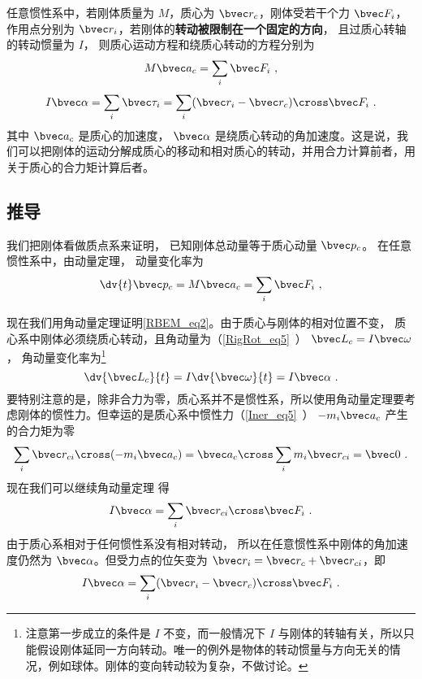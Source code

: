 

任意惯性系中，若刚体质量为 $M$，质心为 $\bvec r_c$，刚体受若干个力 $\bvec F_i$，作用点分别为 $\bvec r_i$，若刚体的\textbf{转动被限制在一个固定的方向}， 且过质心转轴的转动惯量为 $I$， 则质心运动方程和绕质心转动的方程分别为
\begin{equation}\label{RBEM_eq1}
M\bvec a_c = \sum_i \bvec F_i~,
\end{equation}
\begin{equation}\label{RBEM_eq2}
I \bvec \alpha = \sum_i \bvec \tau_i = \sum_i (\bvec r_i-\bvec r_c) \cross  \bvec F_i~.
\end{equation}
其中 $\bvec a_c$ 是质心的加速度， $\bvec \alpha$ 是绕质心转动的角加速度。这是说，我们可以把刚体的运动分解成质心的移动和相对质心的转动，并用合力计算前者，用关于质心的合力矩计算后者。

\subsection{推导}
我们把刚体看做质点系来证明， 已知刚体总动量等于质心动量 $\bvec p_c$。 在任意惯性系中，由动量定理， 动量变化率为
\begin{equation}
\dv{t} \bvec p_c = M \bvec a_c = \sum_i \bvec F_i~,
\end{equation}

现在我们用角动量定理证明\autoref{RBEM_eq2}。由于质心与刚体的相对位置不变，%
质心系中刚体必须绕质心转动，且角动量为（\autoref{RigRot_eq5}~） $\bvec L_c = I \bvec\omega$， 角动量变化率为\footnote{注意第一步成立的条件是 $I$ 不变，而一般情况下 $I$ 与刚体的转轴有关，所以只能假设刚体延同一方向转动。唯一的例外是物体的转动惯量与方向无关的情况，例如球体。刚体的变向转动较为复杂，不做讨论。}
\begin{equation}
\dv{\bvec L_c}{t} = I \dv{\bvec \omega}{t} = I \bvec\alpha~.
\end{equation}
要特别注意的是，除非合力为零，质心系并不是惯性系，所以使用角动量定理要考虑刚体的惯性力。但幸运的是质心系中惯性力（\autoref{Iner_eq5}~） $-m_i \bvec a_c$ 产生的合力矩为零
\begin{equation}
\sum_i \bvec r_{ci}\cross (-m_i \bvec a_{c}) = \bvec a_{c} \cross \sum_i m_i \bvec r_{ci} = \bvec 0~.
\end{equation}
现在我们可以继续角动量定理 得
\begin{equation}
I \bvec\alpha = \sum_i \bvec r_{ci} \cross  \bvec F_i~.
\end{equation}
由于质心系相对于任何惯性系没有相对转动， 所以在任意惯性系中刚体的角加速度仍然为 $\bvec\alpha$。但受力点的位矢变为 $\bvec r_i = \bvec r_c + \bvec r_{ci}$，即
\begin{equation}\label{RBEM_eq7}
I \bvec \alpha = \sum_i (\bvec r_i-\bvec r_c) \cross  \bvec F_i~.
\end{equation}

